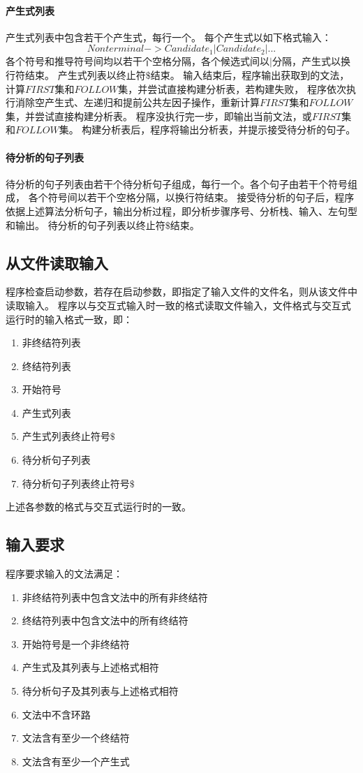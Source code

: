 \documentclass[UTF8]{ctexart}
\begin{document}
\paragraph{产生式列表}
产生式列表中包含若干个产生式，每行一个。
每个产生式以如下格式输入：
$$ Nonterminal -> Candidate_1 | Candidate_2 | ... $$
各个符号和推导符号间均以若干个空格分隔，各个候选式间以$|$分隔，产生式以换行符结束。
产生式列表以终止符$\$$结束。
输入结束后，程序输出获取到的文法，计算$FIRST$集和$FOLLOW$集，并尝试直接构建分析表，若构建失败，
程序依次执行消除空产生式、左递归和提前公共左因子操作，重新计算$FIRST$集和$FOLLOW$集，并尝试直接构建分析表。
程序没执行完一步，即输出当前文法，或$FIRST$集和$FOLLOW$集。
构建分析表后，程序将输出分析表，并提示接受待分析的句子。
\paragraph{待分析的句子列表}
待分析的句子列表由若干个待分析句子组成，每行一个。各个句子由若干个符号组成，
各个符号间以若干个空格分隔，以换行符结束。
接受待分析的句子后，程序依据上述算法分析句子，输出分析过程，即分析步骤序号、分析栈、输入、左句型和输出。
待分析的句子列表以终止符$\$$结束。
\subsection{从文件读取输入}
程序检查启动参数，若存在启动参数，即指定了输入文件的文件名，则从该文件中读取输入。
程序以与交互式输入时一致的格式读取文件输入，文件格式与交互式运行时的输入格式一致，即：
\begin{enumerate}
	\item 非终结符列表
	\item 终结符列表
	\item 开始符号
	\item 产生式列表
	\item 产生式列表终止符号$\$$
	\item 待分析句子列表
	\item 待分析句子列表终止符号$\$$
\end{enumerate}
上述各参数的格式与交互式运行时的一致。
\subsection{输入要求}
程序要求输入的文法满足：
\begin{enumerate}
	\item 非终结符列表中包含文法中的所有非终结符
	\item 终结符列表中包含文法中的所有终结符
	\item 开始符号是一个非终结符
	\item 产生式及其列表与上述格式相符
	\item 待分析句子及其列表与上述格式相符
	\item 文法中不含环路
	\item 文法含有至少一个终结符
	\item 文法含有至少一个产生式
\end{enumerate}
\end{document}
